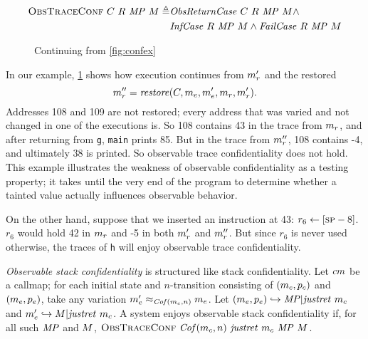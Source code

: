 \documentclass[acmsmall,review,anonymous]{acmart}\settopmatter{printfolios=true,printccs=false,printacmref=false}
\begin{document}
{      \[\begin{split}
        \text{\sc ObsTraceConf} ~ C ~ R ~ \mathit{MP} ~ M \triangleq
        & \mathit{ObsReturnCase} ~ C ~ R ~ \mathit{MP} ~ M \land \\
        & \mathit{InfCase} ~ R ~ \mathit{MP} ~ M \land \mathit{FailCase} ~ R ~
          \mathit{MP} ~ M \\
      \end{split}\]

      \begin{figure}
        \confidentialitylazyexample
        \caption{Continuing from \cref{fig:confex}}
        \label{fig:conflex}
      \end{figure}

      In our example, \cref{fig:conflex} shows how execution continues from
      \(m_r'\) and the restored
      \[m_r'' = \mathit{restore}(C,
      m_e,m_e',m_r,m_r').
      \]
      Addresses 108 and 109
      are not restored; every address that was varied and not changed in one
      of the executions is. So 108 contains 43 in the trace from \(m_r\),
      and after returning from {\tt g}, {\tt main} prints 85. But in the trace
      from \(m_r''\), 108 contains -4, and ultimately 38 is printed.
      So observable trace confidentiality does not hold. This example
      illustrates the weakness of observable confidentiality as a testing
      property; it takes until the very end of the program to determine whether
      a tainted value actually influences observable behavior.

      On the other hand, suppose that we inserted an instruction at 43:
      \(r_6 \leftarrow [\textsc{sp}-8]\). \(r_6\) would hold 42 in \(m_r\)
      and -5 in both \(m_r'\) and \(m_r''\). But since \(r_6\) is
      never used otherwise, the traces of {\tt h} will enjoy observable trace
      confidentiality.


      {\em Observable stack confidentiality} is structured like stack
      confidentiality. Let \(cm\) be a callmap; for each initial
      state and \(n\)-transition consisting of \((m_c,p_c)\)
      and \((m_e,p_e)\), take any variation \(m_e'
      \approx_{\mathit{Cof}(m_c,n)} m_e\). Let
      \((m_e,p_e) \hookrightarrow \mathit{MP} | \mathit{justret}\ m_c\)
      and \(m_e' \hookrightarrow M | \mathit{justret}\ m_c\). A system
      enjoys observable stack confidentiality if, for all such
      \(\mathit{MP}\) and \(M\), \(\text{\sc ObsTraceConf} ~
      \mathit{Cof}(m_c,n) ~ \mathit{justret}\ m_c ~ \mathit{MP} ~ M\).

}
\end{document}
